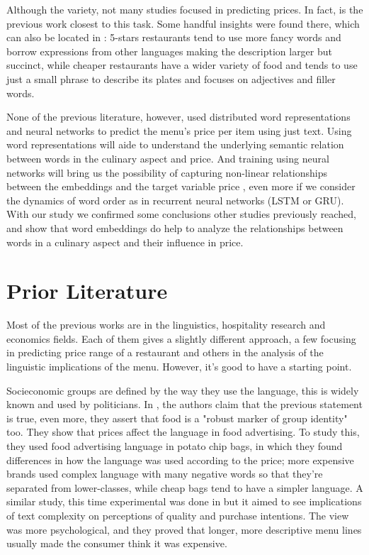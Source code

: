 \documentclass[11pt,letterpaper]{article}
\begin{document}
Although the variety, not many studies focused in predicting prices. In fact, \cite{chahuneau2012word} is the previous work closest to this task. Some handful insights were found there, which can also be located in  \cite{jurafsky2014language,jurafsky2016bordieu}: 5-stars restaurants tend to use more fancy words and borrow expressions from other languages making the description larger but succinct, while cheaper restaurants have a wider variety of food and tends to use just a small phrase to describe its plates and focuses on adjectives and filler words. 

None of the previous literature, however, used distributed word representations and neural networks to predict the menu's price per item using just text. Using word representations will aide to understand the underlying semantic relation between words \cite{mikolov2013efficient} in the culinary aspect and price. And training using neural networks will bring us the possibility of capturing non-linear relationships \cite{beale1990neural} between the embeddings and the target variable price , even more if we consider the dynamics of word order as in recurrent neural networks (LSTM or GRU). With our study we confirmed some conclusions other studies previously reached, and show that word embeddings do help to analyze the relationships between words in a culinary aspect and their influence in price.


\section{Prior Literature}

Most of the previous works are in the linguistics, hospitality research and economics fields. Each of them gives a slightly different approach, a few focusing in predicting price range of a restaurant and others in the analysis of the linguistic implications of the menu. However, it's good to have a starting point.

Socieconomic groups are defined by the way they use the language, this is widely known and used by politicians. In \cite{freedman2011authenticity}, the authors claim that the previous statement is true, even more, they assert that food is a "robust marker of group identity" too. They show that prices affect the language in food advertising. To study this, they used food advertising language in potato chip bags, in which they found differences in how the language was used according to the price; more expensive brands used complex language with many negative words so that they're separated from lower-classes, while cheap bags tend to have a simpler language. A similar study, this time experimental was done in \cite{mccall2008effects} but it aimed to see implications of text complexity on perceptions of quality and purchase intentions. The view was more psychological, and they proved that longer, more descriptive menu lines usually made the consumer think it was expensive.
\end{document}
